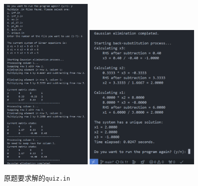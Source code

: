 \begin{figure}[H]
	\centering
	\includegraphics[width=0.4\textwidth]{Problem 2/figs/quiz_1.png}
	\includegraphics[width=0.5\textwidth]{Problem 2/figs/quiz_2.png}
	\caption{原题要求解的\texttt{quiz.in}}
\end{figure}


